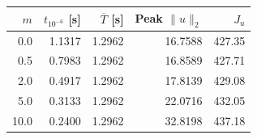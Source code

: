 \begin{tabular}{rrrrr}\toprule
$m$ & $t_{10^{-6}}$ [s] & $\overline T$ [s] & Peak $\|u\|_2$ & $J_u$\\\midrule
 0.0 & 1.1317 & 1.2962 & 16.7588 & 427.35 \\
 0.5 & 0.7983 & 1.2962 & 16.8589 & 427.71 \\
 2.0 & 0.4917 & 1.2962 & 17.8139 & 429.08 \\
 5.0 & 0.3133 & 1.2962 & 22.0716 & 432.05 \\
10.0 & 0.2400 & 1.2962 & 32.8198 & 437.18 \\
\bottomrule\end{tabular}
